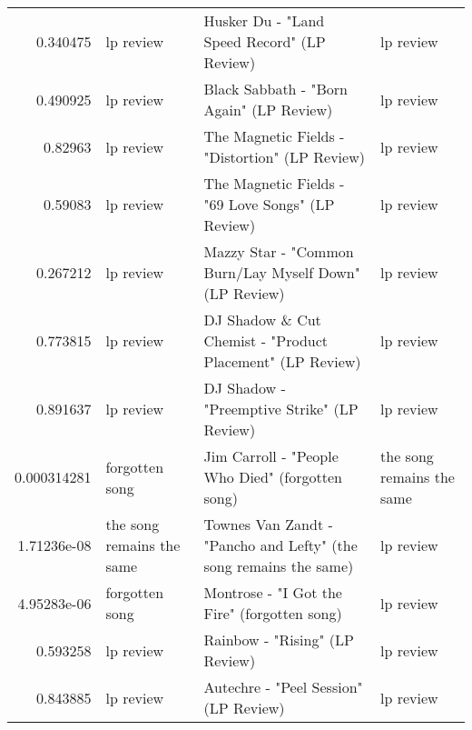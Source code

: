 \documentclass[letterpaper,10pt]{article}
\begin{document}
\begin{table}[H]
\begin{adjustbox}{max width=\linewidth}
\begin{tabular}{rlll}
  0.340475    & lp review                 & Husker Du - "Land Speed Record" (LP Review)                                                                  & lp review                 \\
  0.490925    & lp review                 & Black Sabbath - "Born Again" (LP Review)                                                                     & lp review                 \\
  0.82963     & lp review                 & The Magnetic Fields - "Distortion" (LP Review)                                                               & lp review                 \\
  0.59083     & lp review                 & The Magnetic Fields - "69 Love Songs" (LP Review)                                                            & lp review                 \\
  0.267212    & lp review                 & Mazzy Star - "Common Burn/Lay Myself Down" (LP Review)                                                       & lp review                 \\
  0.773815    & lp review                 & DJ Shadow \& Cut Chemist - "Product Placement" (LP Review)                                                    & lp review                 \\
  0.891637    & lp review                 & DJ Shadow - "Preemptive Strike" (LP Review)                                                                  & lp review                 \\
  0.000314281 & forgotten song            & Jim Carroll - "People Who Died" (forgotten song)                                                             & the song remains the same \\
  1.71236e-08 & the song remains the same & Townes Van Zandt - "Pancho and Lefty" (the song remains the same)                                            & lp review                 \\
  4.95283e-06 & forgotten song            & Montrose - "I Got the Fire" (forgotten song)                                                                 & lp review                 \\
  0.593258    & lp review                 & Rainbow - "Rising" (LP Review)                                                                               & lp review                 \\
  0.843885    & lp review                 & Autechre - "Peel Session" (LP Review)                                                                        & lp review                 \\

\end{tabular}
\end{adjustbox}
\end{table}
\end{document}

